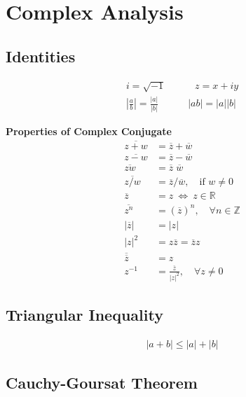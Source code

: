 \documentclass{article}
\numberwithin{theorem}{subsection}
\numberwithin{theorem}{subsubsection}
\numberwithin{lemma}{subsection}
\numberwithin{lemma}{subsubsection}
\theoremstyle{definition}
\numberwithin{definition}{subsection}
\numberwithin{definition}{subsubsection}
\begin{document}
\section{Complex Analysis}

\subsection{Identities}

\begin{gather*}
    i = \sqrt{-1} \quad \quad \quad z = x + iy \\
    \left | \frac{a}{b}\right | = \frac{|a|}{|b|} \quad \quad \quad |ab| = |a||b|
\end{gather*}

\noindent \textbf{Properties of Complex Conjugate} \\
\begin{align*}
             \overline{z + w} &= \overline{z} + \overline{w} \\
             \overline{z - w} &= \overline{z} - \overline{w} \\
                \overline{zw} &= \overline{z} \; \overline{w} \\
               \overline{z/w} &= \overline{z}/\overline{w},\quad \text{if } w \ne 0 \\
                 \overline{z} &= z ~\Leftrightarrow~ z \in \mathbb{R} \\
               \overline{z^n} &= \left(\overline{z}\right)^n,\quad \forall n \in \mathbb{Z} \\
  \left| \overline{z} \right| &= \left| z \right| \\
         {\left| z \right|}^2 &= z\overline{z} = \overline{z}z \\
      \overline{\overline{z}} &= z \\
                       z^{-1} &= \frac{\overline{z}}{{\left| z \right|}^2},\quad \forall z \neq 0
\end{align*}

\subsection{Triangular Inequality}
\begin{gather*}
    |a + b| \leq |a| + |b|
\end{gather*}

\subsection{Cauchy-Goursat Theorem}
\end{document}
